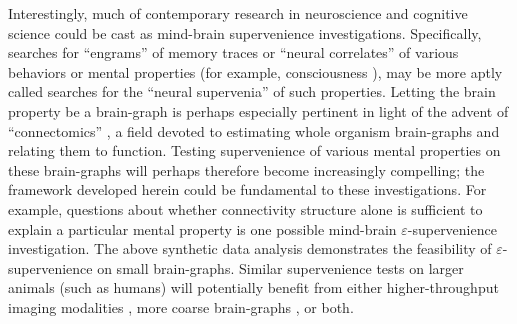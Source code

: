 \documentclass{article}
\newcommand{\eps}{\varepsilon}
\begin{document}
Interestingly, much of contemporary research in neuroscience and cognitive science could be cast as mind-brain supervenience investigations.  Specifically, searches for ``engrams'' of  memory traces \cite{Lashley50} or ``neural correlates''  of various behaviors or mental properties (for example, consciousness \cite{Koch2010}), may be more aptly called searches for the ``neural supervenia'' of such properties.
Letting the brain property be a brain-graph is perhaps especially pertinent in light of the advent of ``connectomics'' \cite{SpornsKotter05,Hagmann05}, a field devoted to estimating whole organism brain-graphs and relating them to function.  Testing supervenience of various mental properties on these brain-graphs will perhaps therefore become increasingly compelling; the framework developed herein could be fundamental to these investigations.  
For example, questions about whether connectivity structure alone is sufficient to explain a particular mental property is one possible mind-brain $\eps$-supervenience investigation.  The above synthetic data analysis demonstrates the feasibility of $\eps$-supervenience on small brain-graphs.
Similar supervenience tests on larger animals (such as humans) will potentially benefit from either higher-throughput imaging modalities \cite{HayworthLichtman06, Bock2011}, more coarse brain-graphs \cite{PalmAmunts10,Johansen-Berg2009}, or both.




\end{document}
